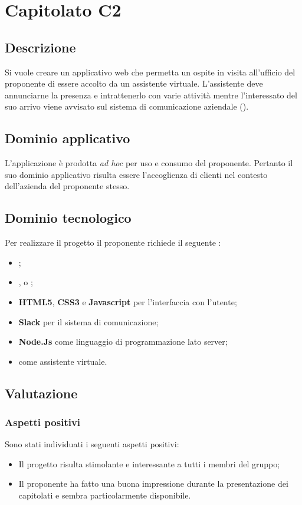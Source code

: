 \documentclass[../StudioDiFattibilita.tex]{subfiles}
\begin{document}
	\section{Capitolato C2}
		\subsection{Descrizione}
		Si vuole creare un applicativo web che permetta un ospite in visita all'ufficio del proponente di essere accolto da un assistente virtuale. L'assistente deve annunciarne la presenza e intrattenerlo con varie attività mentre l'interessato del suo arrivo viene avvisato sul sistema di comunicazione aziendale ().
		\subsection{Dominio applicativo}
			L'applicazione è prodotta \textit{ad hoc} per uso e consumo del proponente. Pertanto il suo dominio applicativo risulta essere l'accoglienza di clienti nel contesto dell'azienda del proponente stesso.
		\subsection{Dominio tecnologico}
			Per realizzare il progetto il proponente richiede il seguente :
		\begin{itemize}
			\item \textbf{}; 
			\item \textbf{}, \textbf{} o \textbf{};
			\item \textbf{HTML5}, \textbf{CSS3} e \textbf{Javascript} per l'interfaccia con l'utente;
			\item \textbf{Slack} per il sistema di comunicazione;
			\item \textbf{Node.Js} \textbf{} come linguaggio di programmazione lato server;
			\item \textbf{} \textbf{} come assistente virtuale.
		\end{itemize}
		\subsection{Valutazione}
			\subsubsection{Aspetti positivi}
			Sono stati individuati i seguenti aspetti positivi:
			\begin{itemize}
				\item Il progetto risulta stimolante e interessante a tutti i membri del gruppo;
				\item Il proponente ha fatto una buona impressione durante la presentazione dei capitolati e sembra particolarmente disponibile.
			\end{itemize}
\end{document}
